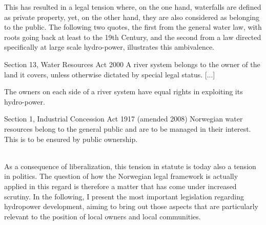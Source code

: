
This has resulted in a legal tension where, on the one hand, waterfalls are defined as private property, yet, on the other hand, they are also considered as belonging to the public. The following two quotes, the first from the general water law, with roots going back at least to the 19th Century, and the second from a law directed specifically at large scale hydro-power, illustrates this ambivalence.

{\begin{minipage}[t]{16em}
 \begin{aquote}{\tiny Section 13, Water Resources Act 2000} \footnotesize A river system belongs to the owner of the land it covers, unless otherwise dictated by special legal status. [...]

The owners on each side of a river system have equal rights in exploiting its hydro-power.
\end{aquote}  
\end{minipage}}
{\begin{minipage}[t]{22em}
\begin{aquote}{\tiny Section 1, Industrial Concession Act 1917 (amended 2008)} \footnotesize Norwegian water resources belong to the general public and are to be managed in their interest. This is to be ensured by public ownership.
\end{aquote}
\end{minipage}} \\

As a consequence of liberalization, this tension in statute is today also a tension in politics. The question of how the Norwegian legal framework is actually applied in this regard is therefore a matter that has come under increased scrutiny. In the following, I present the most important legislation regarding hydropower development, aiming to bring out those aspects that are particularly relevant to the position of local owners and local communities.



